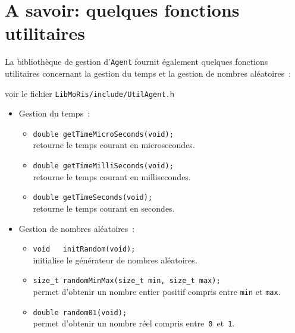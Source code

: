 \documentclass[12pt]{article}
\begin{document}
\hspace{3cm}{\bf ... C'est bien pratique !}

\hspace{3.5cm}{\bf ... C'est bien pratique !}

\hspace{4cm}{\bf ... C'est bien pratique !}

\hspace{4.5cm}{\bf ... C'est bien pratique !}

\hspace{5cm}{\bf ... Et en plus j'ai encore de la place !}

\newpage

\section{A savoir: quelques fonctions utilitaires}

La biblioth\`eque de gestion d'{\tt Agent} fournit \'egalement quelques
fonctions utilitaires concernant la gestion du temps et la gestion
de nombres al\'eatoires~:

\vspace{-0.1cm}
\begin{center}
voir le fichier {\tt LibMoRis/include/UtilAgent.h}
\end{center}

\vspace{-0.2cm}
\begin{itemize}
\item Gestion du temps~:
\begin{itemize}
\item {\tt double getTimeMicroSeconds(void);}\\
retourne le temps courant en microsecondes.
\vspace{-0.1cm}
\item {\tt double getTimeMilliSeconds(void);}\\
retourne le temps courant en millisecondes.
\vspace{-0.1cm}
\item {\tt double getTimeSeconds(void);}\\
retourne le temps courant en secondes.
\end{itemize}
\vspace{-0.2cm}
\item Gestion de nombres al\'eatoires~:
\begin{itemize}
\item {\tt void~~~initRandom(void);}\\
initialise le g\'en\'erateur de nombres al\'eatoires.
\vspace{-0.1cm}
\item {\tt size\_t~randomMinMax(size\_t min, size\_t max);}\\
permet d'obtenir un nombre entier positif compris entre {\tt min} et {\tt max}.
\vspace{-0.1cm}
\item {\tt double~random01(void);}\\
permet d'obtenir un nombre r\'eel compris entre~{\tt 0}~et~{\tt 1}.
\end{itemize}
\end{itemize}
\end{document}
